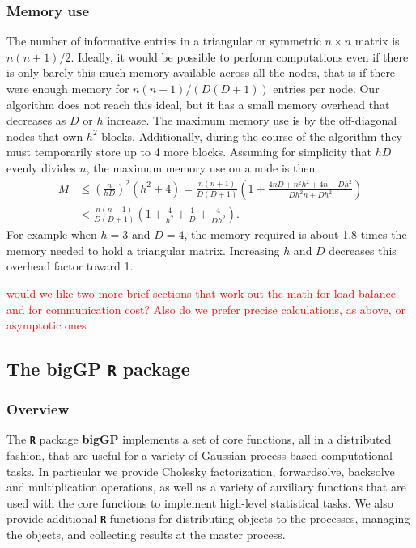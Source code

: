 \documentclass[12pt]{article}
\newcommand{\proglang}[1]{\textbf{\texttt{#1}}}
\newcommand{\pkg}[1]{\textbf{#1}}
\begin{document}
\subsubsection{Memory use}
The number of informative entries in a triangular or symmetric \(n\times n\) matrix is \(n(n+1)/2\).  Ideally, it would be possible to perform computations even if there is only barely this much memory available across all the nodes, that is if there were enough memory for \(n(n+1)/(D(D+1))\) entries per node.  Our algorithm does not reach this ideal, but it has a small memory overhead that decreases as \(D\) or \(h\) increase. The maximum memory use is by the off-diagonal nodes that own \(h^2\) blocks.  Additionally, during the course of the algorithm they must temporarily store up to 4 more blocks.  Assuming for simplicity that $hD$ evenly divides $n$, the maximum memory use on a node is then
\begin{eqnarray}
M&\leq \left(\frac{n}{hD}\right)^2(h^2+4)=\frac{n(n+1)}{D(D+1)}\left(1+\frac{4nD+n^2h^2+4n-Dh^2}{Dh^2n+Dh^2}\right) \\&< \frac{n(n+1)}{D(D+1)}\left(1+\frac{4}{h^2}+\frac{1}{D}+\frac{4}{Dh^2}\right).
\end{eqnarray}
For example when \(h=3\) and \(D=4\), the memory required is about 1.8 times the memory needed to hold a triangular matrix.  Increasing \(h\) and \(D\) decreases this overhead factor toward 1.

\textcolor{red}{would we like two more brief sections that work out the math for load balance and for communication cost? Also do we prefer precise calculations, as above, or asymptotic ones}


\subsection[The bigGP R package]{The \pkg{bigGP} \proglang{R} package}

\subsubsection{Overview}


The \proglang{R} package \pkg{bigGP} implements a set of core functions, all in a distributed fashion, that are useful for a variety of Gaussian process-based computational tasks. In particular we provide Cholesky factorization, forwardsolve, backsolve and multiplication operations, as well as a variety of auxiliary functions that are used with the core functions to implement high-level statistical tasks.  We also provide additional \proglang{R} functions for distributing objects to the processes, managing the objects, and collecting results at the master process.
\end{document}
